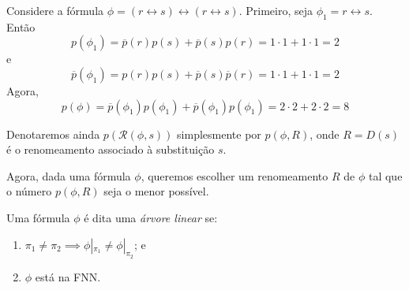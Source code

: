 
\begin{example}
	Considere a fórmula $\phi = (r \leftrightarrow s) \leftrightarrow (r \leftrightarrow s)$. Primeiro, seja $\phi_1 = r \leftrightarrow s$. Então $$p(\phi_1) = \overline{p}(r)p(s) + \overline{p}(s)p(r) = 1 \cdot 1 + 1 \cdot 1 = 2$$ e $$\overline{p}(\phi_1) = p(r)p(s) + \overline{p}(s)\overline{p}(r) = 1 \cdot 1 + 1 \cdot 1 = 2$$ Agora, $$p(\phi) = \overline{p}(\phi_1)p(\phi_1) + \overline{p}(\phi_1)p(\phi_1) = 2 \cdot 2 + 2 \cdot 2 = 8$$
\end{example}

Denotaremos ainda $p(\mathcal{R}(\phi,s))$ simplesmente por $p(\phi,R)$, onde $R = D(s)$ é o renomeamento associado à substituição $s$.

Agora, dada uma fórmula $\phi$, queremos escolher um renomeamento $R$ de $\phi$ tal que o número $p(\phi,R)$ seja o menor possível.

\begin{definition}
	Uma fórmula $\phi$ é dita uma \emph{árvore linear} se:
	\begin{enumerate}
		\item $\pi_1 \neq \pi_2 \implies \phi|_{\pi_1} \neq \phi|_{\pi_2}$; e
		\item $\phi$ está na FNN.
	\end{enumerate}
\end{definition}

